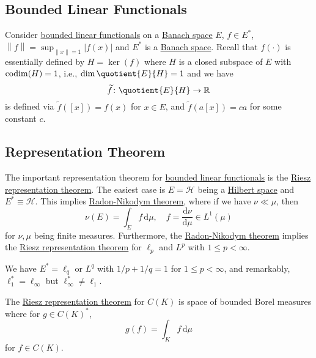 \subsection{Bounded Linear Functionals}
Consider \hyperref[def:bounded-linear-functional]{bounded linear functionals} on a \hyperref[def:Banach-space]{Banach space} \(E\), \(f\in E^{\ast} \), \(\left\lVert f\right\rVert = \sup _{\left\lVert x\right\rVert = 1}\left\vert f(x) \right\vert \) and \(E^{\ast} \) is a \hyperref[def:Banach-space]{Banach space}. Recall that \(f(\cdot)\) is essentially defined by \(H = \ker(f)\) where \(H\) is a closed subspace of \(E\) with \(\operatorname{codim}(H) = 1\), i.e., \(\dim \quotient{E}{H} = 1 \) and we have
\[
	\widetilde{f} \colon \quotient{E}{H} \to \mathbb{R}
\]
is defined via \(\widetilde{f} ([x]) = f(x)\) for \(x\in E\), and \(\widetilde{f} (a[x]) = ca\)  for some constant \(c\).

\subsection{Representation Theorem}
The important representation theorem for \hyperref[def:bounded-linear-functional]{bounded linear functionals} is the \hyperref[thm:Riesz-representation]{Riesz representation theorem}. The easiest case is \(E = \mathcal{H} \) being a \hyperref[def:Hilbert-space]{Hilbert space} and \(E^{\ast} \equiv \mathcal{H} \). This implies \hyperref[thm:Radon-Nikodym]{Radon-Nikodym theorem}, where if we have \(\nu \ll \mu \), then
\[
	\nu (E) = \int _E f\,\mathrm{d} \mu ,\quad f = \frac{\mathrm{d}\nu }{\mathrm{d}\mu } \in L^1(\mu )
\]
for \(\nu , \mu \) being finite measures. Furthermore, the \hyperref[thm:Radon-Nikodym]{Radon-Nikodym theorem} implies the \hyperref[thm:Riesz-representation]{Riesz representation theorem} for \(\ell _p\) and \(L^p\) with \(1 \leq p < \infty \).

\begin{remark}
	We have \(E^{\ast} = \ell _q\) or \(L^q\) with \(1 / p + 1 / q = 1\) for \(1 \leq p < \infty \), and remarkably, \(\ell _1^{\ast} = \ell _\infty \) but \(\ell _\infty ^{\ast} \neq \ell _1\).
\end{remark}

\begin{remark}
	The \hyperref[thm:Riesz-representation]{Riesz representation theorem} for \(C(K)\) is space of bounded Borel measures where for \(g\in C(K)^{\ast} \),
	\[
		g(f) = \int _K f\,\mathrm{d} \mu
	\]
	for \(f\in C(K)\).
\end{remark}

